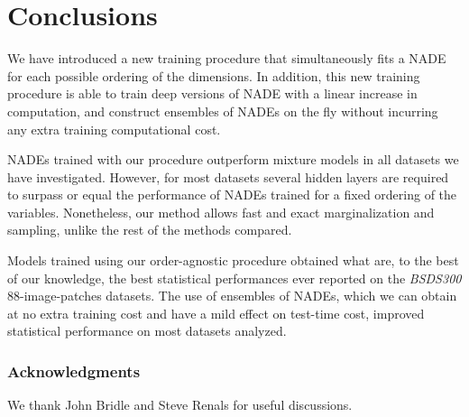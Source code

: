 \documentclass{article}
\begin{document}
\section{Conclusions}
We have introduced a new training procedure that simultaneously fits a NADE for
each possible ordering of the dimensions. In addition, this new training
procedure is able to train deep versions of NADE with a linear increase
in computation, and construct ensembles of NADEs on the fly without incurring
any extra training computational cost.

NADEs trained with our procedure
outperform mixture models in all datasets we have investigated. However, for
most datasets several hidden layers are required to surpass or equal
the performance of NADEs trained for a fixed ordering of the variables.
Nonetheless, our method allows fast and exact marginalization and
sampling, unlike the rest of the methods compared.

Models trained using our order-agnostic procedure obtained what are, to the best
of our knowledge, the best statistical performances ever reported on the
\emph{BSDS300} 88-image-patches datasets. The use of ensembles of NADEs,
which we can obtain at no extra training cost and have a mild effect on
test-time cost, improved statistical performance on most datasets analyzed.
\vspace{-0.5ex}

\subsubsection*{Acknowledgments}\vspace{-0.5ex}
\begin{small}We thank John Bridle and Steve Renals for useful
discussions.\end{small}

\FloatBarrier


\end{document}
